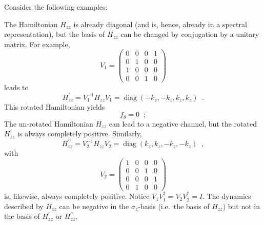 Consider the following examples:
\begin{example}
The Hamiltonian $H_{zz}$ is already diagonal (and is, hence, already in a spectral representation), but the basis of $H_{zz}$ can be changed by conjugation by a unitary matrix.  For example, 
\begin{equation}
\label{eqn:V1basis}
V_1 = \begin{pmatrix}
0&0&0&1\\
0&1&0&0\\
1&0&0&0\\
0&0&1&0
\end{pmatrix} 
\end{equation}
leads to
$$
H^\prime_{zz} = V_1^{-1} H_{zz} V_1 = \operatorname{diag}(-k_z,-k_z,k_z,k_z)\;\;.
$$
This rotated Hamiltonian yields
$$
f_\theta = 0\;\;;
$$
The un-rotated Hamiltonian $H_{zz}$ can lead to a negative channel, but the rotated $H_{zz}^\prime$ is always completely positive.  Similarly,
$$
H^{\prime\prime}_{zz} = V_2^{-1} H_{zz} V_2 = \operatorname{diag}(k_z,k_z,-k_z,-k_z)\;\;,
$$
with 
$$
V_2 = \begin{pmatrix}
1&0&0&0\\
0&0&1&0\\
0&0&0&1\\
0&1&0&0
\end{pmatrix} 
$$
is, likewise, always completely positive.  Notice $V_1V_1^\dagger = V_2V_2^\dagger = I$.  The dynamics described by $H_{zz}$ can be negative in the $\sigma_z$-basis (i.e.\ the basis of $H_{zz}$) but not in the basis of $H^{\prime}_{zz}$ or $H^{\prime\prime}_{zz}$.
\end{example}

